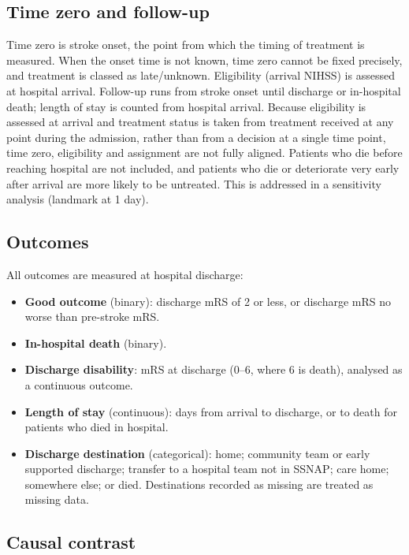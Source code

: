 \subsection{Time zero and follow-up}

Time zero is stroke onset, the point from which the timing of treatment is measured. When the onset time is not known, time zero cannot be fixed precisely, and treatment is classed as late/unknown. Eligibility (arrival NIHSS) is assessed at hospital arrival. Follow-up runs from stroke onset until discharge or in-hospital death; length of stay is counted from hospital arrival. Because eligibility is assessed at arrival and treatment status is taken from treatment received at any point during the admission, rather than from a decision at a single time point, time zero, eligibility and assignment are not fully aligned. Patients who die before reaching hospital are not included, and patients who die or deteriorate very early after arrival are more likely to be untreated. This is addressed in a sensitivity analysis (landmark at 1 day).

\subsection{Outcomes}

All outcomes are measured at hospital discharge:
\begin{itemize}
\item \textbf{Good outcome} (binary): discharge mRS of 2 or less, or discharge mRS no worse than pre-stroke mRS.
\item \textbf{In-hospital death} (binary).
\item \textbf{Discharge disability}: mRS at discharge (0--6, where 6 is death), analysed as a continuous outcome.
\item \textbf{Length of stay} (continuous): days from arrival to discharge, or to death for patients who died in hospital.
\item \textbf{Discharge destination} (categorical): home; community team or early supported discharge; transfer to a hospital team not in SSNAP; care home; somewhere else; or died. Destinations recorded as missing are treated as missing data.
\end{itemize}

\subsection{Causal contrast}

